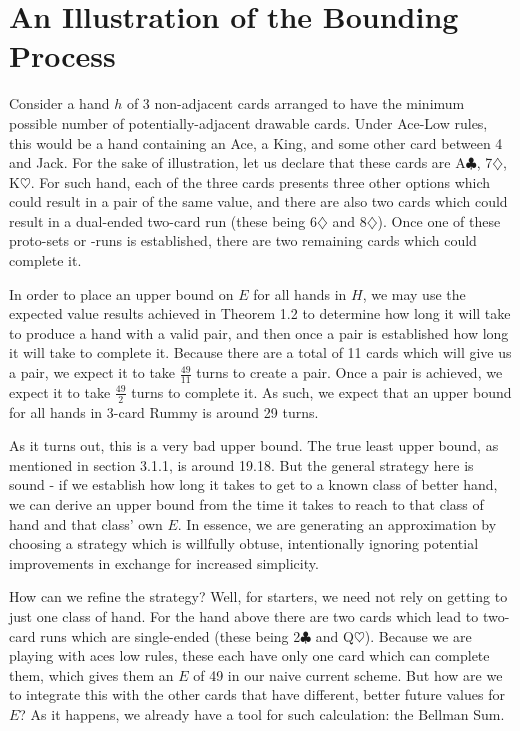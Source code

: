 \documentclass[paper=a4, fontsize=11pt,twoside]{report}   %
\begin{document}
\section{An Illustration of the Bounding Process}

Consider a hand $h$ of 3 non-adjacent cards arranged to have the minimum possible number of potentially-adjacent drawable cards. Under Ace-Low rules, this would be a hand containing an Ace, a King, and some other card between 4 and Jack. For the sake of illustration, let us declare that these cards are A$\clubsuit$, 7$\diamondsuit$, K$\heartsuit$. For such hand, each of the three cards presents three other options which could result in a pair of the same value, and there are also two cards which could result in a dual-ended two-card run (these being 6$\diamondsuit$ and 8$\diamondsuit$). Once one of these proto-sets or -runs is established, there are two remaining cards which could complete it.

In order to place an upper bound on $E$ for all hands in $H$, we may use the expected value results achieved in Theorem 1.2 to determine how long it will take to produce a hand with a valid pair, and then once a pair is established how long it will take to complete it. Because there are a total of 11 cards which will give us a pair, we expect it to take $\frac{49}{11}$ turns to create a pair. Once a pair is achieved, we expect it to take $\frac{49}{2}$ turns to complete it. As such, we expect that an upper bound for all hands in 3-card Rummy is around 29 turns.

As it turns out, this is a very bad upper bound. The true least upper bound, as mentioned in section 3.1.1, is around 19.18. But the general strategy here is sound - if we establish how long it takes to get to a known class of better hand, we can derive an upper bound from the time it takes to reach to that class of hand and that class' own $E$. In essence, we are generating an approximation by choosing a strategy which is willfully obtuse, intentionally ignoring potential improvements in exchange for increased simplicity.

How can we refine the strategy? Well, for starters, we need not rely on getting to just one class of hand. For the hand above there are two cards which lead to two-card runs which are single-ended (these being 2$\clubsuit$ and Q$\heartsuit$). Because we are playing with aces low rules, these each have only one card which can complete them, which gives them an $E$ of 49 in our naive current scheme. But how are we to integrate this with the other cards that have different, better future values for $E$? As it happens, we already have a tool for such calculation: the Bellman Sum.
\end{document}
